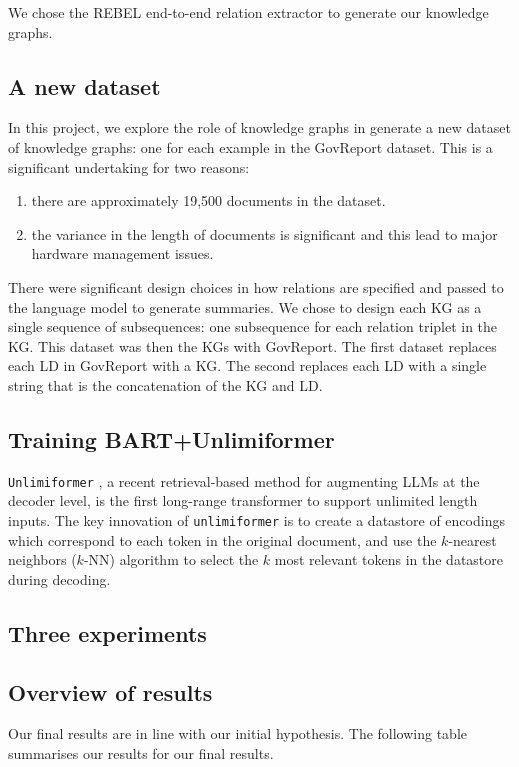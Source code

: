 \documentclass[12pt]{article}
\begin{document}
We chose the REBEL end-to-end relation extractor to generate our knowledge graphs.

\subsection*{A new dataset}
In this project, we explore the role of knowledge graphs in generate a new
dataset of knowledge graphs: one for each example in the GovReport dataset.
This is a significant undertaking for two reasons:
\begin{enumerate}
  \item there are approximately 19,500 documents in the dataset.
  \item the variance in the length of documents is significant and this lead to
    major hardware management issues.
\end{enumerate}
There were significant design choices in how relations are specified and passed
to the language model to generate summaries. We chose to design each KG as a
single sequence of subsequences: one subsequence for each relation triplet in
the KG.
This dataset was then  the KGs with GovReport. The first
dataset replaces each LD in GovReport with a KG. The second replaces each LD
with a single string that is the concatenation of the KG and LD.
\subsection*{Training BART+Unlimiformer}
\texttt{Unlimiformer} \cite{bertsch2023unlimiformer}, a recent retrieval-based
method for augmenting LLMs at the decoder level, is the first long-range
transformer to support unlimited length inputs. The key innovation of
\texttt{unlimiformer} is to create a datastore of encodings which correspond to
each token in the original document, and use the $k$-nearest neighbors ($k$-NN)
algorithm to select the $k$ most relevant tokens in the datastore during
decoding.

\subsection*{Three experiments}

\subsection*{Overview of results}
Our final results are in line with our initial hypothesis. The following table
summarises our results for our final results.
\end{document}
